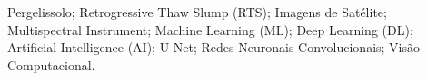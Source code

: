 \begin{keywords}
Pergelissolo; Retrogressive Thaw Slump (RTS); Imagens de Satélite; Multispectral Instrument; Machine Learning (ML); Deep Learning (DL); Artificial Intelligence (AI); U-Net; Redes Neuronais Convolucionais; Visão Computacional.
\end{keywords}

%
%
